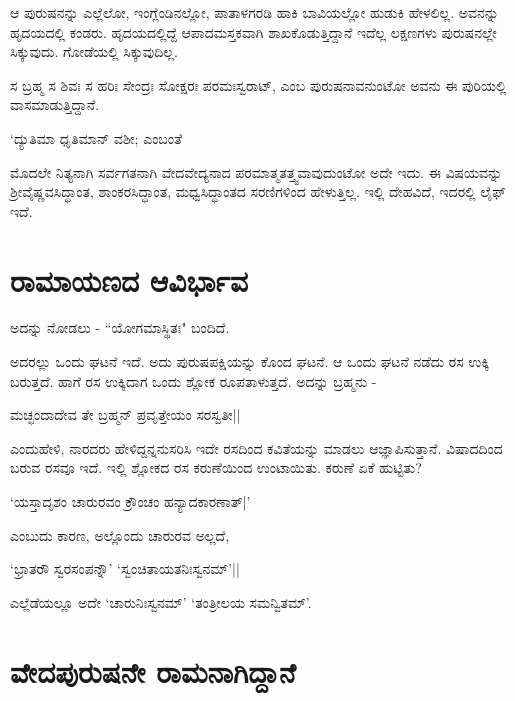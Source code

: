 ಆ ಪುರುಷನನ್ನು ಎಲ್ಲೆಲೋ, ಇಂಗ್ಲೆಂಡಿನಲ್ಲೋ, ಪಾತಾಳಗರಡಿ ಹಾಕಿ ಬಾವಿಯಲ್ಲೋ ಹುಡುಕಿ ಹೇಳಲಿಲ್ಲ. ಅವನನ್ನು ಹೃದಯದಲ್ಲಿ ಕಂಡರು. ಹೃದಯದಲ್ಲಿದ್ದೆ ಆಪಾದಮಸ್ತಕವಾಗಿ ಶಾಖಕೊಡುತ್ತಿದ್ದಾನೆ ಇದೆಲ್ಲ ಲಕ್ಷಣಗಳು ಪುರುಷನಲ್ಲೇ ಸಿಕ್ಕುವುದು. ಗೋಡೆಯಲ್ಲಿ ಸಿಕ್ಕುವುದಿಲ್ಲ. 

ಸ ಬ್ರಹ್ಮ ಸ ಶಿವಃ ಸ ಹರಿಃ ಸೇಂದ್ರಃ ಸೋಕ್ಷರಃ ಪರಮಃಸ್ವರಾಟ್, ಎಂಬ ಪುರುಷನಾವನುಂಟೋ ಅವನು ಈ ಪುರಿಯಲ್ಲಿ ವಾಸಮಾಡುತ್ತಿದ್ದಾನೆ.

\begin{shloka}
`ದ್ಯುತಿಮಾ ಧೃತಿಮಾನ್ ವಶೀ; ಎಂಬಂತೆ \label{249}
\end{shloka}

ಮೊದಲೇ ನಿತ್ಯನಾಗಿ ಸರ್ವಗತನಾಗಿ ವೇದವೇದ್ಯನಾದ ಪರಮಾತ್ಮತತ್ತ್ವವಾವುದುಂಟೋ ಅದೇ ಇದು. ಈ ವಿಷಯವನ್ನು ಶ್ರೀವೈಷ್ಣವಸಿದ್ಧಾಂತ, ಶಾಂಕರಸಿದ್ಧಾಂತ, ಮಧ್ವಸಿದ್ಧಾಂತದ ಸರಣಿಗಳಿಂದ ಹೇಳುತ್ತಿಲ್ಲ. ಇಲ್ಲಿ ದೇಹವಿದೆ, ಇದರಲ್ಲಿ ಲೈಫ್ ಇದೆ. 

\section*{ರಾಮಾಯಣದ ಆವಿರ್ಭಾವ}

\begin{shloka}
ಅದನ್ನು ನೋಡಲು - ``ಯೋಗಮಾಸ್ಥಿತಃ"\label{249b} ಬಂದಿದೆ.
\end{shloka}

ಅದರಲ್ಲು ಒಂದು ಘಟನೆ ಇದೆ. ಅದು ಪುರುಷಪಕ್ಷಿಯನ್ನು ಕೊಂದ ಘಟನೆ. ಆ ಒಂದು ಘಟನೆ ನಡೆದು ರಸ ಉಕ್ಕಿ ಬರುತ್ತದೆ. ಹಾಗೆ ರಸ ಉಕ್ಕಿದಾಗ ಒಂದು ಶ್ಲೋಕ ರೂಪತಾಳುತ್ತದೆ. ಅದನ್ನು ಬ್ರಹ್ಮನು -

\begin{shloka}
ಮಚ್ಛಂದಾದೇವ ತೇ ಬ್ರಹ್ಮನ್  ಪ್ರವೃತ್ತೇಯಂ ಸರಸ್ವತೀ||\label{250c}
\end{shloka}

ಎಂದುಹೇಳಿ, ನಾರದರು ಹೇಳಿದ್ದನ್ನನುಸರಿಸಿ ಇದೇ ರಸದಿಂದ ಕವಿತೆಯನ್ನು ಮಾಡಲು ಆಜ್ಞಾಪಿಸುತ್ತಾನೆ. ವಿಷಾದದಿಂದ ಬರುವ ರಸವೂ ಇದೆ. ಇಲ್ಲಿ ಶ್ಲೋಕದ ರಸ ಕರುಣೆಯಿಂದ ಉಂಟಾಯಿತು. ಕರುಣೆ ಏಕೆ ಹುಟ್ಟಿತು? 

\begin{shloka}
`ಯಸ್ತಾದೃಶಂ ಚಾರುರವಂ ಕ್ರೌಂಚಂ ಹನ್ಯಾದಕಾರಣಾತ್|'\label{250d}
\end{shloka}

ಎಂಬುದು ಕಾರಣ, ಅಲ್ಲೊಂದು ಚಾರುರವ ಅಲ್ಲದೆ, 

\begin{shloka}
`ಭ್ರಾತರೌ ಸ್ವರಸಂಪನ್ನೌ' `ಸ್ವಂಚಿತಾಯತನಿಃಸ್ವನಮ್'||\label{250b}
\end{shloka}

ಎಲ್ಲೆಡೆಯಲ್ಲೂ ಅದೇ `ಚಾರುನಿಃಸ್ವನಮ್'\label{250} `ತಂತ್ರೀಲಯ ಸಮನ್ವಿತಮ್'.

\section*{ವೇದಪುರುಷನೇ ರಾಮನಾಗಿದ್ದಾನೆ}

